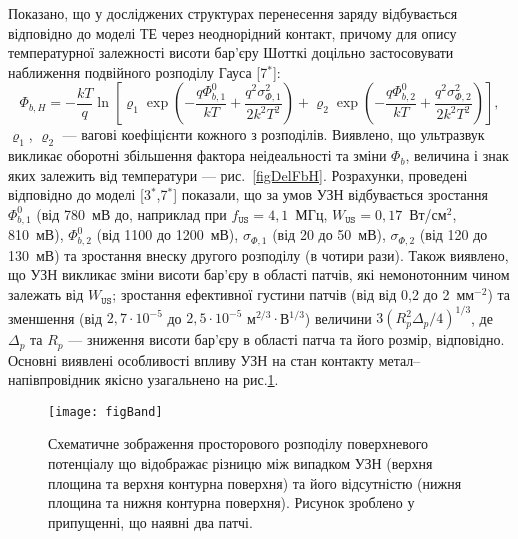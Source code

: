 Показано, що у досліджених структурах перенесення заряду відбувається відповідно до моделі ТЕ через неоднорідний контакт,
причому для опису температурної залежності висоти бар'єру Шотткі доцільно застосовувати наближення подвійного розподілу Гауса
[7$^*$]:
\begin{equation}
\label{eqDG}
  \Phi_{b,H}=-\frac{kT}{q}\ln\left[\varrho_1\exp\left(-\frac{q\Phi_{b,1}^0}{kT}+
  \frac{q^2\sigma^2_{\Phi,1}}{2k^2T^2}\right)
   +
  \varrho_2\exp\left(-\frac{q\Phi_{b,2}^{0}}{kT}+
  \frac{q^2\sigma^2_{\Phi,2}}{2k^2T^2}\right)\right],
\end{equation}
$\varrho_1$, $\varrho_2$  --- вагові коефіцієнти кожного з розподілів.
Виявлено, що ультразвук викликає оборотні збільшення фактора неідеальності та зміни $\Phi_{b}$,
величина і знак яких залежить від температури --- рис.~\ref{figDelFbH}.
Розрахунки, проведені відповідно до моделі
[3$^*$,7$^*$] показали, що за умов УЗН відбувається зростання
$\Phi_{b,1}^0$ (від 780~мВ до, наприклад при $f_\mathtt{US}=4,1$~МГц, $W_\mathtt{US}=0,17$~Вт/см$^2$,  810~мВ),
$\Phi_{b,2}^0$ (від 1100 до  1200~мВ),
$\sigma_{\Phi,1}$ (від 20 до  50~мВ),
$\sigma_{\Phi,2}$ (від 120 до  130~мВ) та
зростання внеску другого розподілу (в чотири рази).
Також виявлено,
що УЗН викликає зміни висоти бар'єру в області патчів, які немонотонним чином залежать від $W_\mathtt{US}$;
зростання ефективної густини патчів (від від 0,2 до 2~мм$^{-2}$) та зменшення (від $2,7\cdot10^{-5}$ до $2,5\cdot10^{-5}$ м$^{2/3}\cdot$В$^{1/3}$)
величини $3(R_p^2\Delta_p/4)^{1/3}$, де $\Delta_p$ та $R_p$ --- зниження висоти бар'єру в області патча та його розмір, відповідно.
Основні виявлені особливості впливу УЗН на стан контакту метал--напівпровідник якісно узагальнено на рис.\ref{figBand}.



\begin{figure}
\center
\texttt{[image: figBand]}
\caption{\label{figBand}
Схематичне зображення
просторового розподілу поверхневого потенціалу
що відображає різницю між випадком УЗН (верхня площина та верхня контурна поверхня) та
його відсутністю (нижня площина та нижня контурна поверхня).
Рисунок зроблено у припущенні, що наявні два патчі.
\vspace{1em}
}%
\end{figure}

